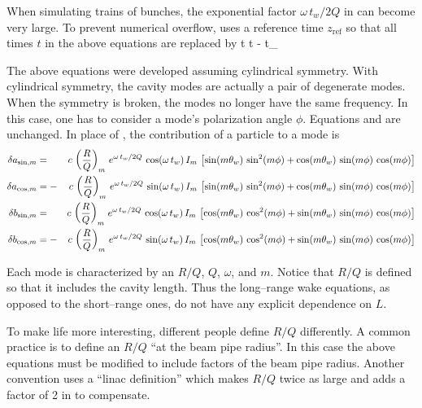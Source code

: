When simulating trains of bunches, the exponential factor $\omega \, t_w / 2
Q$ in  can become very large. To prevent numerical overflow,
\bmad uses a reference time $z_{\text{ref}}$ so that all times
$t$ in the above equations are replaced by
\Begineq
  t \longrightarrow t - t_{}
\Endeq

The above equations were developed assuming cylindrical symmetry. With
cylindrical symmetry, the cavity modes are actually a pair of
degenerate modes. When the symmetry is broken, the modes no longer have the
same frequency. In this case, one has to consider a mode's polarization
angle $\phi$. Equations  and  are unchanged. 
In place of , the contribution of a particle to a mode is
\begin{alignat}{2}
  \delta a_{\sin, m} &=  &c \, \left( \frac{R}{Q} \right)_m \,
    e^{\omega \, t_w/ 2 Q} \, \cos (\omega \, t_w) \, I_m \, \left[
    \sin(m \theta_w) \, \sin^2(m \phi) + 
    \cos(m \theta_w) \, \sin(m \phi) \, \cos(m\phi) \right]
    \nonumber \\
  \delta a_{\cos, m} &= -&c \, \left( \frac{R}{Q} \right)_m \,
    e^{\omega \, t_w/ 2 Q} \, \sin (\omega \, t_w) \, I_m \, \left[ 
    \sin(m \theta_w) \, \sin^2(m \phi) + 
    \cos(m \theta_w) \, \sin(m \phi) \, \cos(m\phi) \right]
    \\
  \delta b_{\sin, m} &=  &c \, \left( \frac{R}{Q} \right)_m \,
    e^{\omega \, t_w/ 2 Q} \, \cos (\omega \, t_w) \, I_m \, \left[
    \cos(m \theta_w) \, \cos^2(m \phi) + 
    \sin(m \theta_w) \, \sin(m \phi) \, \cos(m\phi) \right]
    \nonumber \\
  \delta b_{\cos, m} &= -&c \, \left( \frac{R}{Q} \right)_m \,
    e^{\omega \, t_w/ 2 Q} \, \sin (\omega \, t_w) \, I_m \, \left[
    \cos(m \theta_w) \, \cos^2(m \phi) + 
    \sin(m \theta_w) \, \sin(m \phi) \, \cos(m\phi) \right]
    \nonumber
\end{alignat}

Each mode is characterized by an $R/Q$, $Q$, $\omega$, and $m$. Notice
that $R/Q$ is defined so that it includes the cavity length. Thus the
long--range wake equations, as opposed to the short--range ones, do
not have any explicit dependence on $L$. 

To make life more interesting, different people define $R/Q$
differently. A common practice is to define an $R/Q$ ``at the beam
pipe radius''. In this case the above equations must be modified to
include factors of the beam pipe radius. Another convention uses a
``linac definition'' which makes $R/Q$ twice as large and adds a
factor of 2 in  to compensate.

